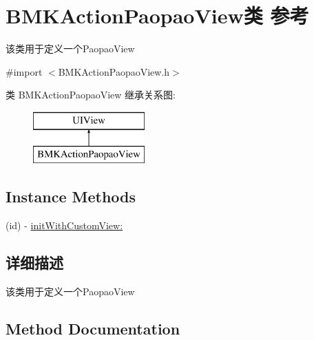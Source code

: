 \hypertarget{interface_b_m_k_action_paopao_view}{}\section{B\+M\+K\+Action\+Paopao\+View类 参考}
\label{interface_b_m_k_action_paopao_view}


该类用于定义一个\+Paopao\+View  




{\ttfamily \#import $<$B\+M\+K\+Action\+Paopao\+View.\+h$>$}

类 B\+M\+K\+Action\+Paopao\+View 继承关系图\+:\begin{figure}[H]
\begin{center}
\leavevmode
\includegraphics[height=2.000000cm]{interface_b_m_k_action_paopao_view}
\end{center}
\end{figure}
\subsection*{Instance Methods}
\begin{DoxyCompactItemize}
\item 
(id) -\/ \hyperlink{interface_b_m_k_action_paopao_view_ae6a2f4ea0ff6a408b963f6f1eb068ef5}{init\+With\+Custom\+View\+:}
\end{DoxyCompactItemize}


\subsection{详细描述}
该类用于定义一个\+Paopao\+View 

\subsection{Method Documentation}
\hypertarget{interface_b_m_k_action_paopao_view_ae6a2f4ea0ff6a408b963f6f1eb068ef5}{}
